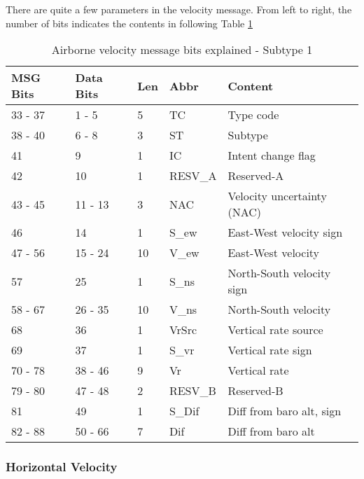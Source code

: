There are quite a few parameters in the velocity message. From left to
right, the number of bits indicates the contents in following Table \ref{tb:adsb-v-bits-st-1}

\begin{table}[!ht]
\centering
\caption{Airborne velocity message bits explained - Subtype 1}
\label{tb:adsb-v-bits-st-1}
\begin{tabular}{@{}lllll@{}}
\toprule
MSG Bits & Data Bits & Len & Abbr    & Content                    \\ \midrule
33 - 37  & 1 - 5     & 5   & TC      & Type code                  \\
38 - 40  & 6 - 8     & 3   & ST      & Subtype                    \\
41       & 9         & 1   & IC      & Intent change flag         \\
42       & 10        & 1   & RESV\_A & Reserved-A                 \\
43 - 45  & 11 - 13   & 3   & NAC     & Velocity uncertainty (NAC) \\
46       & 14        & 1   & S\_ew   & East-West velocity sign    \\
47 - 56  & 15 - 24   & 10  & V\_ew   & East-West velocity         \\
57       & 25        & 1   & S\_ns   & North-South velocity sign  \\
58 - 67  & 26 - 35   & 10  & V\_ns   & North-South velocity       \\
68       & 36        & 1   & VrSrc   & Vertical rate source       \\
69       & 37        & 1   & S\_vr   & Vertical rate sign         \\
70 - 78  & 38 - 46   & 9   & Vr      & Vertical rate              \\
79 - 80  & 47 - 48   & 2   & RESV\_B & Reserved-B                 \\
81       & 49        & 1   & S\_Dif  & Diff from baro alt, sign   \\
82 - 88  & 50 - 66   & 7   & Dif     & Diff from baro alt         \\ \bottomrule
\end{tabular}
\end{table}


\subsubsection{Horizontal Velocity}\label{horizontal-velocity}

